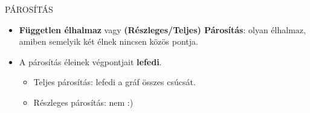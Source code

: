 \begin{definicio}{PÁROSÍTÁS}
  \begin{itemize}
  \item \textbf{Független élhalmaz} vagy \textbf{(Részleges/Teljes) Párosítás}: olyan élhalmaz, amiben semelyik két élnek nincsen közös pontja.
  \item A párosítás éleinek végpontjait \textbf{lefedi}.
    \begin{itemize}
    \item Teljes párosítás: lefedi a gráf összes csúcsát.
    \item Részleges párosítás: nem :)
    \end{itemize}
  \end{itemize}
\end{definicio}